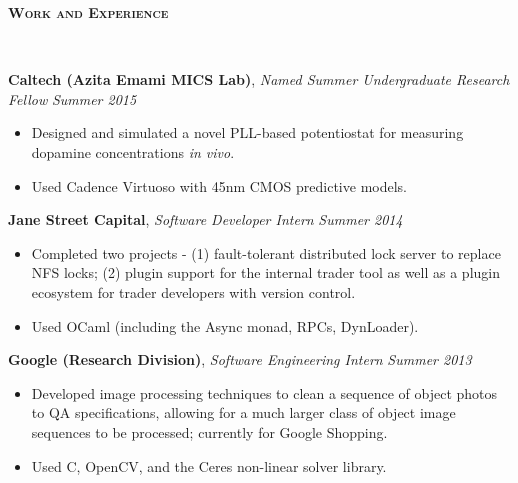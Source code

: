 \documentclass{article}
\newenvironment{changemargin}[2]{%
  \begin{list}{}{%
    \setlength{\topsep}{0pt}%
    \setlength{\leftmargin}{#1}%
    \setlength{\rightmargin}{#2}%
    \setlength{\listparindent}{\parindent}%
    \setlength{\itemindent}{\parindent}%
    \setlength{\parsep}{\parskip}%
  }%
  \item[]}{\end{list}
}
\newcommand{\lineover}{
	\begin{changemargin}{-0.05in}{-0.05in}
		\vspace*{-8pt}
		\hrulefill \\
		\vspace*{-2pt}
	\end{changemargin}
}
\newcommand{\header}[1]{
	\begin{changemargin}{-.5in}{-0.5in}
		{\large \textbf{\scshape{#1}}}\\
  	\lineover
	\end{changemargin}
}
\newenvironment{body} {
	\vspace*{-16pt}
	\begin{changemargin}{-0.25in}{-0.5in}
  }	
	{\end{changemargin}
}
\newcommand{\CC}{C\nolinebreak\hspace{-.05em}\raisebox{.4ex}{\tiny\bf +}\nolinebreak\hspace{-.10em}\raisebox{.4ex}{\tiny\bf +}}
\begin{document}
\smallskip


\header{Work and Experience}

\begin{body}
	\vspace{14pt}
	
	\textbf{Caltech (Azita Emami MICS Lab)}, \emph{Named Summer Undergraduate Research Fellow} \hfill \emph{Summer 2015}\\
	\vspace*{-4pt}
	\begin{itemize}
		\item Designed and simulated a novel PLL-based potentiostat for measuring dopamine concentrations \emph{in vivo}.
		\item Used Cadence Virtuoso with 45nm CMOS predictive models. %
	\end{itemize}

	\smallskip

	\textbf{Jane Street Capital}, \emph{Software Developer Intern} \hfill \emph{Summer 2014}\\
	\vspace*{-4pt}
	\begin{itemize}
		\item Completed two projects - (1) fault-tolerant distributed lock server to replace NFS locks; (2) plugin support for the internal trader tool as well as a plugin ecosystem for trader developers with version control.
		\item Used OCaml (including the Async monad, RPCs, DynLoader).
	\end{itemize}

	\smallskip

	\textbf{Google (Research Division)}, \emph{Software Engineering Intern} \hfill \emph{Summer 2013}\\
	\vspace*{-4pt}
	\begin{itemize}
		\item Developed image processing techniques to clean a sequence of object photos to QA specifications, allowing for a much larger class of object image sequences to be processed; currently for Google Shopping.
		\item Used \CC, OpenCV, and the Ceres non-linear solver library.
	\end{itemize}

	\smallskip


\end{body}
\end{document}
